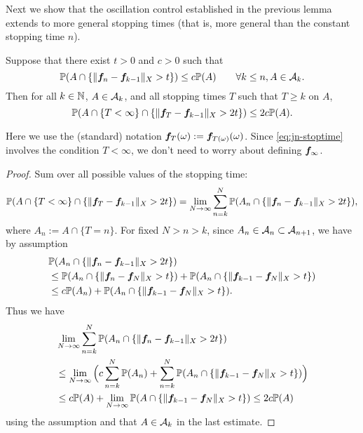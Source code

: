 Next we show that the oscillation control established in the previous lemma extends to more general stopping times (that is, more general than the constant stopping time $n$).

\begin{lem}\label{lem:st-extension}
  Suppose that there exist $t > 0$ and $c > 0$ such that
  \begin{equation*}
    \mathbb{P}(A \cap \{ \| \bm{f}_n - \bm{f}_{k-1} \|_{X} > t \} ) \leq c \mathbb{P}(A) \qquad \forall k \leq n, A \in \mathcal{A}_k.
  \end{equation*}
  Then for all $k \in \mathbb{N}$, $A \in \mathcal{A}_k$, and all stopping times $T$ such that $T \geq k$ on $A$,
  \begin{equation}\label{eq:jn-stoptime}
    \mathbb{P}(A \cap \{T < \infty\} \cap \{ \| \bm{f}_{T} - \bm{f}_{k-1} \|_{X} > 2t \} ) \leq 2c \mathbb{P}(A).
  \end{equation}
\end{lem}

Here we use the (standard) notation $\bm{f}_{T}(\omega) := \bm{f}_{T(\omega)}(\omega)$.
Since \eqref{eq:jn-stoptime} involves the condition $T < \infty$, we don't need to worry about defining $\bm{f}_{\infty}$.

\begin{proof}
  Sum over all possible values of the stopping time:
  \begin{equation*}
      \mathbb{P}(A \cap \{T < \infty\} \cap \{ \| \bm{f}_{T} - \bm{f}_{k-1} \|_{X} > 2t \} ) 
      = \lim_{N \to \infty} \sum_{n = k}^{N} \mathbb{P}(A_n \cap \{ \| \bm{f}_{n} - \bm{f}_{k-1} \|_{X} > 2t \} ),
  \end{equation*}
  where $A_{n} := A \cap \{T = n\}$.
  For fixed $N > n > k$, since $A_n \in \mathcal{A}_n \subset \mathcal{A}_{n+1}$, we have by assumption
  \begin{equation*}
    \begin{aligned}
      &\mathbb{P}(A_n \cap \{ \| \bm{f}_{n} - \bm{f}_{k-1} \|_{X} > 2t \} ) \\
      &\leq \mathbb{P}(A_n \cap \{ \| \bm{f}_{n} - \bm{f}_{N} \|_{X} > t \} )
      + \mathbb{P}(A_n \cap \{ \| \bm{f}_{k-1} - \bm{f}_{N} \|_{X} > t \} ) \\
      &\leq c \mathbb{P}(A_n) + \mathbb{P}(A_n \cap \{ \| \bm{f}_{k-1} - \bm{f}_{N} \|_{X} > t \} ).
    \end{aligned}
  \end{equation*}
  Thus we have
  \begin{equation*}
    \begin{aligned}
      &\lim_{N \to \infty} \sum_{n = k}^{N} \mathbb{P}(A_n \cap \{ \| \bm{f}_{n} - \bm{f}_{k-1} \|_{X} > 2t \} ) \\
      &\leq \lim_{N \to \infty} \Big( c \sum_{n=k}^N \mathbb{P}(A_n) + \sum_{n=k}^N \mathbb{P}(A_n \cap \{ \| \bm{f}_{k-1} - \bm{f}_{N} \|_{X} > t \}) \Big) \\
      &\leq c \mathbb{P}(A) + \lim_{N \to \infty} \mathbb{P}(A \cap \{ \| \bm{f}_{k-1} - \bm{f}_{N} \|_{X} > t \})  
      \leq 2c\mathbb{P}(A)
    \end{aligned}
  \end{equation*}
  using the assumption and that $A \in \mathcal{A}_k$ in the last estimate.
\end{proof}
  
